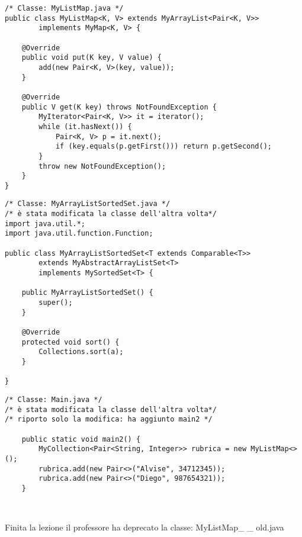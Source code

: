 \begin{lstlisting}[basicstyle=\small,]
/* Classe: MyListMap.java */
public class MyListMap<K, V> extends MyArrayList<Pair<K, V>>
        implements MyMap<K, V> {

    @Override
    public void put(K key, V value) {
        add(new Pair<K, V>(key, value));
    }

    @Override
    public V get(K key) throws NotFoundException {
        MyIterator<Pair<K, V>> it = iterator();
        while (it.hasNext()) {
            Pair<K, V> p = it.next();
            if (key.equals(p.getFirst())) return p.getSecond();
        }
        throw new NotFoundException();
    }
}
\end{lstlisting}

\begin{lstlisting}[basicstyle=\small,]
/* Classe: MyArrayListSortedSet.java */
/* è stata modificata la classe dell'altra volta*/
import java.util.*;
import java.util.function.Function;

public class MyArrayListSortedSet<T extends Comparable<T>>
        extends MyAbstractArrayListSet<T>
        implements MySortedSet<T> {

    public MyArrayListSortedSet() {
        super();
    }

    @Override
    protected void sort() {
        Collections.sort(a);
    }

}
\end{lstlisting}



\begin{lstlisting}[basicstyle=\small,]
/* Classe: Main.java */
/* è stata modificata la classe dell'altra volta*/
/* riporto solo la modifica: ha aggiunto main2 */

    public static void main2() {
        MyCollection<Pair<String, Integer>> rubrica = new MyListMap<>();
        rubrica.add(new Pair<>("Alvise", 34712345));
        rubrica.add(new Pair<>("Diego", 987654321));
    }



\end{lstlisting}

\noindent Finita la lezione il professore ha deprecato la classe: MyListMap\_ \_ old.java